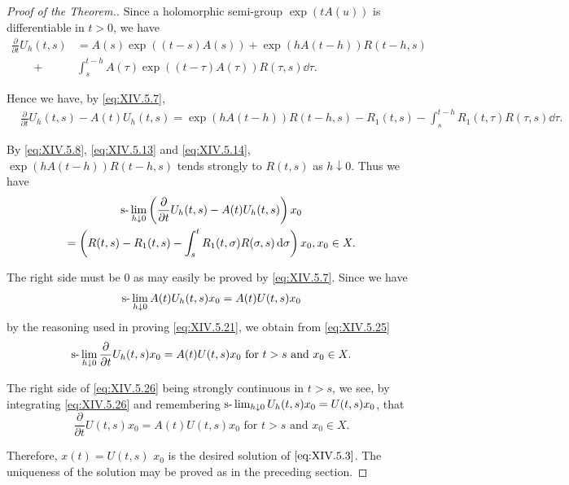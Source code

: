 \begin{proof}[Proof of the Theorem.]
Since a holomorphic semi-group $\exp(tA(u))$ is differentiable in $t > 0$, we have 
\[
\begin{aligned}
\frac {\partial}{\partial t} U _{h} (t, s)& = A (s) \exp ((t - s) A (s)) + \exp (h A (t - h)) R (t - h, s)
\\
\qquad +& \int_{s} ^{t-h} A (\tau) \exp ((t - \tau) A (\tau)) R (\tau , s) \dd \tau .
\end{aligned}
\]

Hence we have, by \eqref{eq:XIV.5.7}, 
\begin{equation}\label{eq:XIV.5.24}
\begin{aligned}
&\frac {\partial}{\partial t} U _{h} (t, s) - A (t) U _{h} (t, s)  = \exp (h A (t - h)) R (t - h, s) - R _{1} (t, s) - \int_{s} ^{t-h} R _{1} (t, \tau) R (\tau , s) \dd \tau .
\end{aligned}
\end{equation}

By \eqref{eq:XIV.5.8}, \eqref{eq:XIV.5.13} and \eqref{eq:XIV.5.14}, $\exp(hA(t-h))R(t-h,s)$ tends strongly to $R(t,s)$ as $h\downarrow 0$. Thus we have 
\begin{equation}\label{eq:XIV.5.25}
\begin{gathered}
\text{s-}\lim _{h \downarrow 0} \left(\frac {\partial}{\partial t} U _{h} (t, s) - A (t) U _{h} (t, s)\right) x _{0}
\\
= \left(R (t, s) - R _{1} (t, s) - \int_{s} ^{t} R _{1} (t, \sigma) R (\sigma , s) \mathop{}\!\mathrm{d} \sigma\right) x _{0}, x _{0} \in X.
\end{gathered}
\end{equation}

The right side must be $0$ as may easily be proved by \eqref{eq:XIV.5.7}. Since we have 
\[
\text{s-}\lim _{h \downarrow 0} A (t) U _{h} (t, s) x _{0} = A (t) U (t, s) x _{0}
\]
by the reasoning used in proving \eqref{eq:XIV.5.21}, we obtain from \eqref{eq:XIV.5.25} 
\begin{equation}\label{eq:XIV.5.26}
\text{s-}\lim _{h \downarrow 0} \frac {\partial}{\partial t} U _{h} (t, s) x _{0} = A (t) U (t, s) x _{0} \text{ for } t > s \text{ and } x _{0} \in X.
\end{equation}

The right side of \eqref{eq:XIV.5.26} being strongly continuous in $t > s$, we see, by integrating \eqref{eq:XIV.5.26} and remembering $\text{s-}\lim\nolimits_{h\downarrow 0}U_h(t,s)x_0 = U(t,s)x_0$, that 
\begin{equation}\label{eq:XIV.5.27}
\frac {\partial}{\partial t} U (t, s) x _{0} = A (t) U (t, s) x _{0} \text{ for } t > s \text{ and } x _{0} \in X.
\end{equation}

Therefore, $x(t) = U(t, s)$ $x_{0}$ is the desired solution of $\eqref{eq:XIV.5.3}$. The uniqueness of the solution may be proved as in the preceding section. 
\end{proof}

